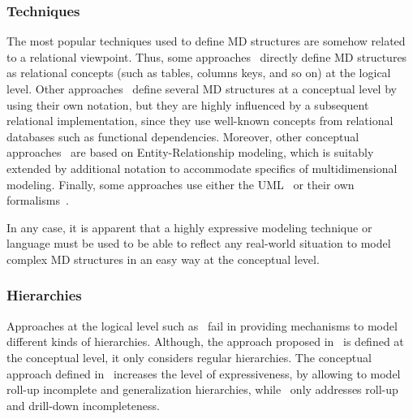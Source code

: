 \subsubsection{Techniques} The most popular techniques used to define
MD structures are somehow related to a relational viewpoint. Thus,
some approaches~\cite{book/Kimball/DW,DBLP:conf/dmdw/SongRME01}
directly define MD structures as relational concepts (such as
tables, columns keys, and so on) at the logical level. Other
approaches~\cite{DBLP:journals/ijcis/GolfarelliMR98,DBLP:conf/dmdw/HusemannLV00}
define several MD structures at a conceptual level by using their
own notation, but they are highly influenced by a subsequent
relational implementation, since they use well-known concepts from
relational databases such as functional dependencies. Moreover,
other conceptual
approaches~\cite{DBLP:journals/dke/MalinowskiZ06,MansmannIJDWDM07}
are based on Entity-Relationship modeling, which is suitably
extended by additional notation to accommodate specifics of
multidimensional modeling.
%
Finally, some approaches use either the
UML~\cite{DBLP:journals/dke/Lujan-MoraTS06,DBLP:journals/is/AbelloSS06,DBLP:journals/dss/PratAC06}
or their own
formalisms~\cite{DBLP:journals/tods/HurtadoGM05,DBLP:journals/is/PedersenJD01}.

In any case, it is apparent that a highly expressive modeling
technique or language must be used to be able to reflect any
real-world situation to model complex MD structures in an easy way
at the conceptual level.

\subsubsection{Hierarchies}
Approaches at the logical level such as~\cite{book/Kimball/DW} fail
in providing mechanisms to model different kinds of hierarchies.
Although, the approach proposed
in~\cite{DBLP:journals/ijcis/GolfarelliMR98} is defined at the
conceptual level, it only considers regular hierarchies. The
conceptual approach defined
in~\cite{DBLP:conf/dmdw/HusemannLV00,DBLP:journals/is/LechtenborgerV03}
increases the level of expressiveness, by allowing to model roll-up
incomplete and generalization hierarchies,
while~\cite{DBLP:journals/tods/HurtadoGM05} only addresses roll-up
and drill-down incompleteness.

